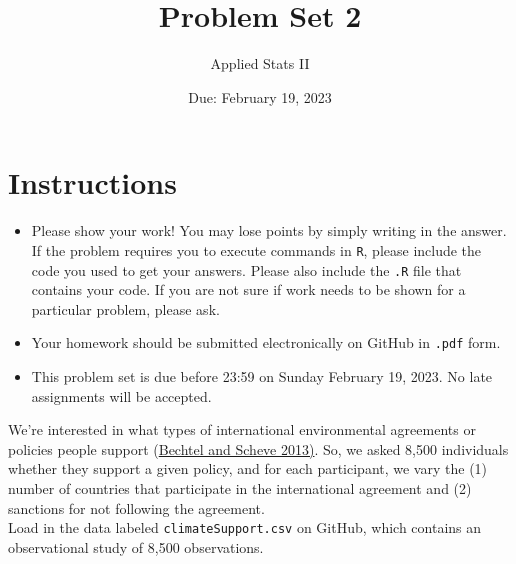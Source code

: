 \documentclass[12pt,letterpaper]{article}
\title{Problem Set 2}
\date{Due: February 19, 2023}
\author{Applied Stats II}
\begin{document}
	\maketitle
	\section*{Instructions}
	\begin{itemize}
		\item Please show your work! You may lose points by simply writing in the answer. If the problem requires you to execute commands in \texttt{R}, please include the code you used to get your answers. Please also include the \texttt{.R} file that contains your code. If you are not sure if work needs to be shown for a particular problem, please ask.
		\item Your homework should be submitted electronically on GitHub in \texttt{.pdf} form.
		\item This problem set is due before 23:59 on Sunday February 19, 2023. No late assignments will be accepted.
	\end{itemize}

	
	

	\vspace{.25cm}
\noindent We're interested in what types of international environmental agreements or policies people support (\href{https://www.pnas.org/content/110/34/13763}{Bechtel and Scheve 2013)}. So, we asked 8,500 individuals whether they support a given policy, and for each participant, we vary the (1) number of countries that participate in the international agreement and (2) sanctions for not following the agreement. \\

\noindent Load in the data labeled \texttt{climateSupport.csv} on GitHub, which contains an observational study of 8,500 observations.
\end{document}
